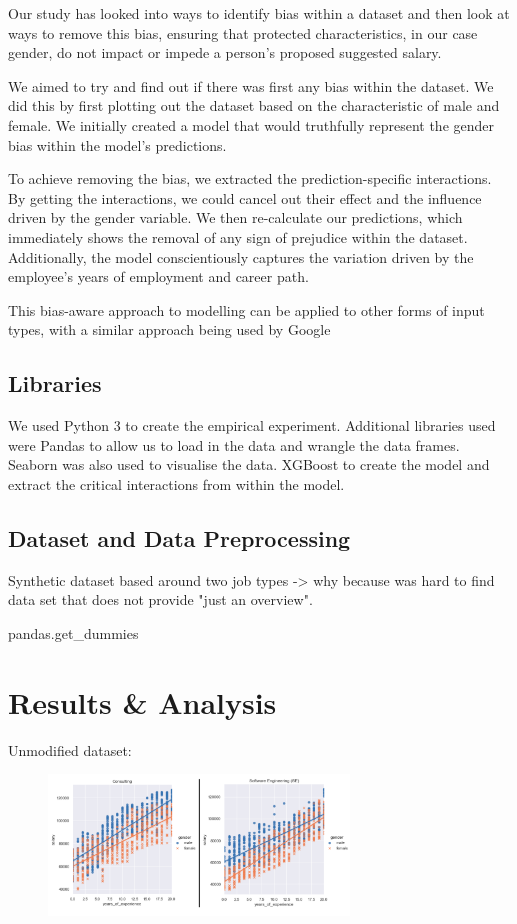 \documentclass{sigchi}
\begin{document}
	Our study has looked into ways to identify bias within a dataset and then look at ways to remove this bias, ensuring that protected characteristics, in our case gender, do not impact or impede a person's proposed suggested salary.  

	We aimed to try and find out if there was first any bias within the dataset. We did this by first plotting out the dataset based on the characteristic of male and female. We initially created a model that would truthfully represent the gender bias within the model's predictions.

	To achieve removing the bias, we extracted the prediction-specific interactions. By getting the interactions, we could cancel out their effect and the influence driven by the gender variable. We then re-calculate our predictions, which immediately shows the removal of any sign of prejudice within the dataset. Additionally, the model conscientiously captures the variation driven by the employee's years of employment and career path. 

	This bias-aware approach to modelling can be applied to other forms of input types, with a similar approach being used by Google \cite{google_ref}

\subsection{Libraries}
	We used Python 3 \cite{python} to create the empirical experiment. Additional libraries used were Pandas \cite{pandas} to allow us to load in the data and wrangle the data frames. Seaborn \cite{seaborn} was also used to visualise the data. XGBoost \cite{xgboost} to create the model and extract the critical interactions from within the model. 

\subsection{Dataset and Data Preprocessing}
	Synthetic dataset based around two job types -> why because was hard to find data set that does not provide "just an overview". 

pandas.get\_dummies


\section{Results \& Analysis}



Unmodified dataset:
\begin{figure}[h]
	\includegraphics[width=8cm]{original_data.png}
	\centering
\end{figure}
\end{document}
